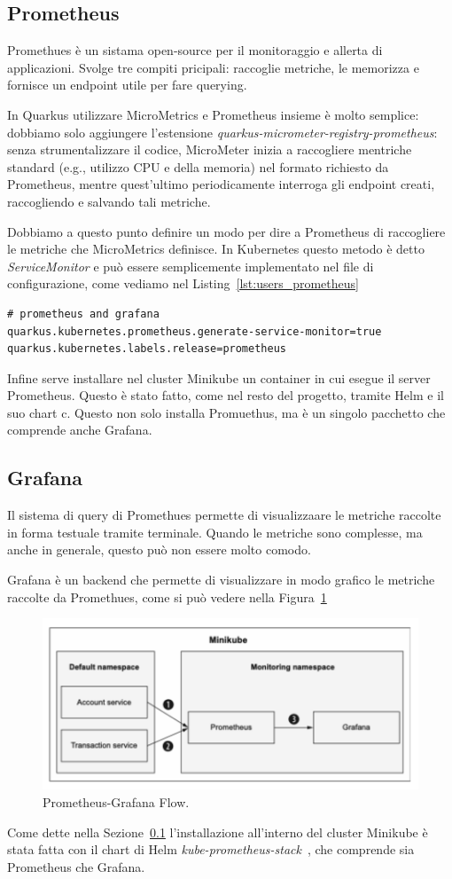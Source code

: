 \subsection{Prometheus}
\label{sec:prometheus}
Promethues è un sistama open-source per il monitoraggio e allerta di applicazioni. Svolge tre compiti pricipali: raccoglie metriche, le memorizza e fornisce un endpoint utile per fare querying.

\myskip

In Quarkus utilizzare MicroMetrics e Prometheus insieme è molto semplice: dobbiamo solo aggiungere l'estensione \textit{quarkus-micrometer-registry-prometheus}: senza strumentalizzare il codice, MicroMeter inizia a raccogliere mentriche standard (e.g., utilizzo CPU e della memoria) nel formato richiesto da Prometheus, mentre quest'ultimo periodicamente interroga gli endpoint creati, raccogliendo e salvando tali metriche.

Dobbiamo a questo punto definire un modo per dire a Prometheus di raccogliere le metriche che MicroMetrics definisce. In Kubernetes questo metodo è detto \textit{ServiceMonitor} e può essere semplicemente implementato nel file di configurazione, come vediamo nel Listing~\ref{lst:users_prometheus}
\begin{lstlisting}[caption=Prometheus configuration for \textit{users-service}, label=lst:users_prometheus]
# prometheus and grafana
quarkus.kubernetes.prometheus.generate-service-monitor=true
quarkus.kubernetes.labels.release=prometheus
\end{lstlisting}

Infine serve installare nel cluster Minikube un container in cui esegue il server Prometheus. Questo è stato fatto, come nel resto del progetto, tramite Helm e il suo chart c. Questo non solo installa Promuethus, ma è un singolo pacchetto che comprende anche Grafana.

\subsection{Grafana}
Il sistema di query di Promethues permette di visualizzaare le metriche raccolte in forma testuale tramite terminale. Quando le metriche sono complesse, ma anche in generale, questo può non essere molto comodo.

Grafana è un backend che permette di visualizzare in modo grafico le metriche raccolte da Promethues, come si può vedere nella Figura~\ref{fig:pr_gr_flow}
\begin{figure}[htbp]
    \centering
    \includegraphics[width=.7\textwidth]{images/4-tracing_metrics/prom graf flow.pdf}
    \caption{Prometheus-Grafana Flow.}
    \label{fig:pr_gr_flow}
\end{figure}

Come dette nella Sezione~\ref{sec:prometheus} l'installazione all'interno del cluster Minikube è stata fatta con il chart di Helm \textit{kube-prometheus-stack}~\cite{prometheus_stack}, che comprende sia Prometheus che Grafana.